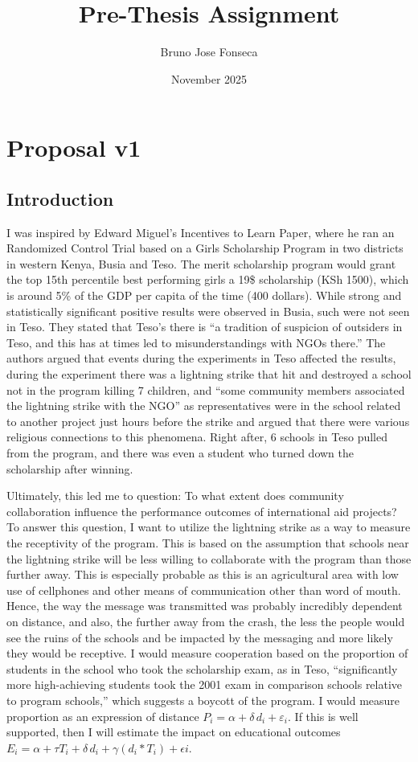 \documentclass{article}
\title{ Pre-Thesis Assignment}
\author{Bruno Jose Fonseca}
\date{November 2025}
\begin{document}
\maketitle

\section{Proposal v1}
\subsection{Introduction}
I was inspired by Edward Miguel's Incentives to Learn Paper, where he ran an Randomized Control Trial based on a Girls Scholarship Program in two districts in western Kenya, Busia and Teso.\autocite[esp.~441]{kremer-miguel-thornton-2009} The merit scholarship program would grant the top 15th percentile best performing girls a 19\$ scholarship (KSh 1500), which is around 5\% of the GDP per capita of the time (400 dollars). \autocite[441]{kremer-miguel-thornton-2009} While strong and statistically significant positive results were observed in Busia, such were not seen in Teso. They stated that Teso's there is “a tradition of suspicion of outsiders in Teso, and this has at times led to misunderstandings with NGOs there.”\autocite[441]{kremer-miguel-thornton-2009}  The authors argued that events during the experiments in Teso affected the results, during the experiment there was a lightning strike that hit and destroyed a school not in the program killing 7 children, and “some community members associated the lightning strike with the NGO” as representatives were in the school related to another project just hours before the strike and argued that there were various religious connections to this phenomena. Right after, 6 schools in Teso pulled from the program, and there was even a student who turned down the scholarship after winning. 

Ultimately, this led me to question: To what extent does community collaboration influence the performance outcomes of international aid projects? To answer this question, I want to utilize the lightning strike as a way to measure the receptivity of the program. This is based on the assumption that schools near the lightning strike will be less willing to collaborate with the program than those further away. This is especially probable as this is an agricultural area with low use of cellphones and other means of communication other than word of mouth. Hence, the way the message was transmitted was probably incredibly dependent on distance, and also, the further away from the crash, the less the people would see the ruins of the schools and be impacted by the messaging and more likely they would be receptive. I would measure cooperation based on the proportion of students in the school who took the scholarship exam, as in Teso, “significantly more high-achieving students took the 2001 exam in comparison schools relative to program schools,” which suggests a boycott of the program. I would measure proportion as an expression of distance $P_i = \alpha + \delta\, d_i + \varepsilon_i$. If this is well supported, then I will estimate the impact on educational outcomes  $E_i= \alpha + \tau T_i+ \delta\,d_i +  \gamma (d_i*T_i) +\epsilon i$. 
\end{document}

